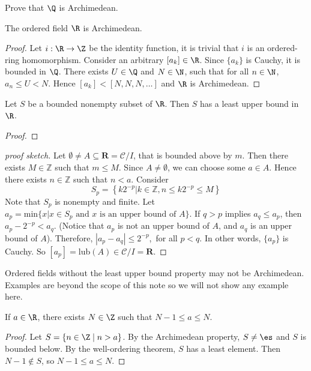 \documentclass[10pt]{article}
\begin{document}
\begin{problem}
    Prove that $\Q$ is Archimedean.
\end{problem}
\begin{proposition}
    The ordered field $\R$ is Archimedean.
\end{proposition}
\begin{proof}
    Let $i:\R\to\Z$ be the identity function, it is trivial that $i$ is an ordered-ring homomorphism. Consider an arbitrary $[{a}_{k}]\in\R$. Since $\{{a}_{k}\}$ is Cauchy, it is bounded in $\Q$. There exists $U\in\Q$ and $N\in\N$, such that for all $n\in\N$, ${a}_{n}\le U<N$. Hence $[{a}_{k}]<[N,N,N,\dots]$ and $\R$ is Archimedean.
\end{proof}
\begin{proposition}
    Let $S$ be a bounded nonempty subset of $\R$. Then $S$ has a least upper bound in $\R$.
\end{proposition}
\begin{proof}
    
\end{proof}
\begin{proof}[proof sketch]
    Let $\emptyset\neq A\subseteq\mathbf{R}=\mathcal{C}/{I}$, that is bounded above by $m$. Then there exists $ M\in\mathbb{Z}$ such that $m\leq M$. Since $A\neq\emptyset$, we can choose some $a\in A$. Hence there exists $ n\in\mathbb{Z}$ such that $n<a$. Consider 
    $$
        S_p=\left\{k2^{-p}\big|k\in\mathbb{Z},n\leq k2^{-p}\leq M\right\}
    $$
    Note that $S_p$ is nonempty and finite. Let $a_p=\text{min}\{x|x\in S_p \text{ and } x\text{ is an upper bound of } A\}$. If $q>p$ implies $a_q\leq a_p$, then $a_p-2^{-p}<a_q$. (Notice that $a_p$ is not an upper bound of $A$, and $a_q$ is an upper bound of $A$). Therefore, $|a_p-a_q|\leq 2^{-p}$,\ for all $p<q$. In other words, $\{a_p\}$ is Cauchy. So $[a_p]=$lub$(A)\in\mathcal{C}/{I}=\mathbf{R}$.
\end{proof}
\par    
Ordered fields without the least upper bound property may not be Archimedean. Examples are beyond the scope of this note so we will not show any example here.
\begin{proposition}
    If $a\in\R$, there exists $N\in\Z$ such that $N-1\leq a\leq N$.
\end{proposition}
\begin{proof}
    Let $S=\{n\in\Z\mid n>a\}$. By the Archimedean property, $S\ne\es$ and $S$ is bounded below. By the well-ordering theorem, $S$ has a least element. Then $N-1\notin S$, so $N-1\le a\le N$.
\end{proof}
\end{document}
